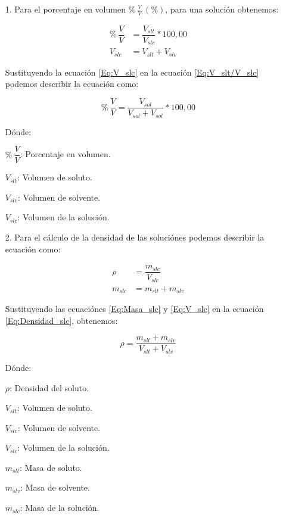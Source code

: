 \documentclass[12pt,letterpaper]{article}
\begin{document}
\begin{enumerate}

	\item[1.] Para el porcentaje en volumen $\% \ \frac{V}{V} \ (\%)$, para una solución obtenemos:

\begin{align}
\% \ \dfrac{V}{V} &= \dfrac{V_{slt}}{V_{slc}} * 100,00
\label{Eq:V_slt/V_slc}\\
V_{slc} &= V_{slt} + V_{slv}
\label{Eq:V_slc}
\end{align}

Sustituyendo la ecuación \ref{Eq:V_slc} en la ecuación \ref{Eq:V_slt/V_slc} podemos describir la ecuación como:

\begin{equation}
\% \ \dfrac{V}{V} = \dfrac{V_{sol}}{V_{sol} + V_{sol}} * 100,00
\label{Eq:V/V}
\end{equation}

Dónde:\

$\% \ \dfrac{V}{V}$: Porcentaje en volumen.\

$V_{slt}$: Volumen de soluto.\

$V_{slv}$: Volumen de solvente.\

$V_{slc}$: Volumen de la solución.

\end{enumerate}



\begin{enumerate}

	\item[2.] Para el cálculo de la densidad de las soluciónes podemos describir la ecuación como:

\begin{align}
\rho &= \dfrac{m_{slc}}{V_{slc}}
\label{Eq:Densidad_slc}\\
m_{slc} &= m_{slt} + m_{slv}
\label{Eq:Masa_slc}
\end{align}

Sustituyendo las ecuaciónes \ref{Eq:Masa_slc} y \ref{Eq:V_slc} en la ecuación \ref{Eq:Densidad_slc}, obtenemos:

\begin{equation}
\rho = \dfrac{m_{slt} + m_{slv}}{V_{slt} + V_{slv}}
\label{Eq:rho}
\end{equation}

Dónde:\

$\rho$: Densidad del soluto.\

$V_{slt}$: Volumen de soluto.\

$V_{slv}$: Volumen de solvente.\

$V_{slc}$: Volumen de la solución.\

$m_{slt}$: Masa de soluto.\

$m_{slv}$: Masa de solvente.\

$m_{slc}$: Masa de la solución.

\end{enumerate}
\end{document}
